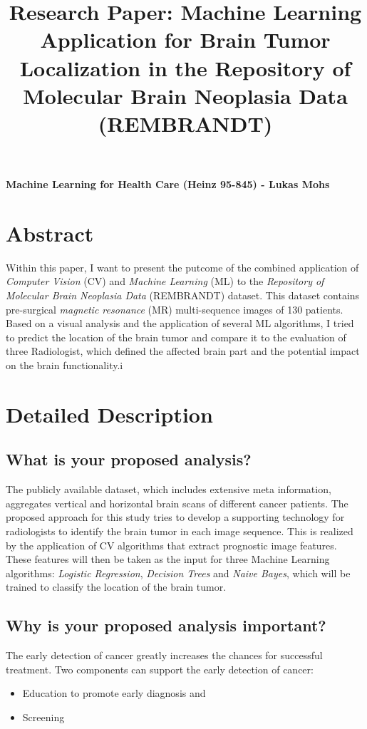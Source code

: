 \documentclass[twoside,11pt]{article}
\begin{document}
\title{Research Paper: Machine Learning Application for Brain Tumor Localization in the  Repository of Molecular Brain Neoplasia Data (REMBRANDT) }

\maketitle
\textbf{Machine Learning for Health Care (Heinz 95-845) - Lukas Mohs}


\section{Abstract}
\noindent Within this paper, I want to present the putcome of the  combined application of \textit{Computer Vision} (CV) and  \textit{Machine Learning} (ML) to the \textit{Repository of Molecular Brain Neoplasia Data } (REMBRANDT) dataset. This dataset contains pre-surgical \textit{magnetic resonance} (MR) multi-sequence images of 130 patients. Based on a visual analysis and the application of several ML algorithms, I tried to predict the location of the brain tumor and compare it to the evaluation of three Radiologist, which defined the affected brain part and the potential impact on the brain functionality.i

\section{Detailed Description}
\subsection{What is your proposed analysis?}
The publicly available dataset, which includes extensive meta information, aggregates vertical and horizontal brain scans of different cancer patients. The proposed approach for this study tries to develop a supporting technology for radiologists to identify the brain tumor in each image sequence. This is realized by the application of CV algorithms that extract prognostic image features. These features will then be taken as the input for three Machine Learning algorithms: \textit{Logistic Regression}, \textit{Decision Trees} and \textit{Naive Bayes}, which will be trained to classify the location of the brain tumor.

\subsection{Why is your proposed analysis important?}
The early detection of cancer greatly increases the chances for successful treatment. Two components can support the early detection of cancer:
\begin{itemize}
	\item Education to promote early diagnosis and
	\item Screening
\end{itemize}
\citep{cite1}
\end{document}
